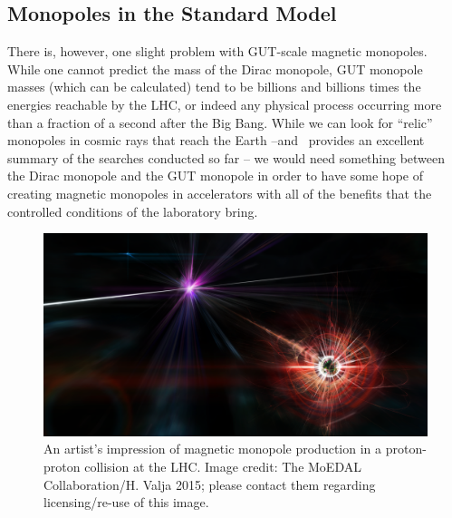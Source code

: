 \subsection{Monopoles in the Standard Model}
\label{sec:smmonopole}
There is, however, one slight problem with \ac{GUT}-scale magnetic monopoles.
While one cannot predict the mass of the Dirac monopole,
\ac{GUT} monopole masses (which can be calculated) tend to be billions
and billions times the energies reachable by the \ac{LHC}, or indeed any
physical process occurring more than a fraction of a second after the Big Bang.
While we can look for ``relic'' monopoles in cosmic rays that reach the
Earth --and~\cite{Patrizii2015} provides an excellent summary of the searches
conducted so far -- we would need something between the Dirac monopole
and the \ac{GUT} monopole in order to have some hope of creating
magnetic monopoles in accelerators with all of the benefits that the
controlled conditions of the laboratory bring.

%
\begin{figure}[htbp]
  \centering
  \includegraphics[width=1.0\textwidth]{assets/images/monopole-artist/monopole-artist.png}
  \caption[An artist's impression of magnetic monopole production at the LHC]
  {\label{fig:monopoleartist}%
An artist's impression of magnetic monopole production in a proton-proton
collision at the \acf{LHC}. Image credit: The MoEDAL Collaboration/H. Valja 2015;
please contact them regarding licensing/re-use of this image.}
\end{figure}
%

